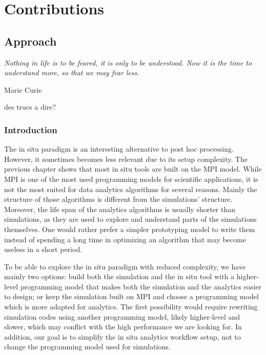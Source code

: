 \pagestyle{fancy}
\fancyhead{}
\fancyfoot{}
\fancyfoot[RO,LE]{\thepage}



\part{Contributions}\label{part:contribution}


\chapter{Approach}\label{chap:approach}
\vspace{20mm}
\epigraph{\textit{Nothing in life is to be feared, it is only to be understood. Now it is the time to understand more, so that we may fear less.}} {Marie Curie}

\vfill
des trucs a dire?

\section{Introduction}

The in situ paradigm is an interesting alternative to post hoc processing. However, it sometimes becomes less relevant due to its setup complexity. 
The previous chapter shows that most in situ tools are built on the MPI model. While MPI is one of the most used programming models for scientific applications, it is not the most suited for data analytics algorithms for several reasons. 
Mainly the structure of those algorithms is different from the simulations' structure. Moreover, the life span of the analytics algorithms is usually shorter than simulations, as they are used to explore and understand parts of the simulations themselves. One would rather prefer a simpler prototyping model to write them instead of spending a long time in optimizing an algorithm that may become useless in a short period.

To be able to explore the in situ paradigm with reduced complexity, we have mainly two options: build both the simulation and the in situ tool with a higher-level programming model that makes both the simulation and the analytics easier to design; or keep the simulation built on MPI and choose a programming model which is more adapted for analytics.
The first possibility would require rewriting simulation codes using another programming model, likely higher-level and slower, which may conflict with the high performance we are looking for. In addition, our goal is to simplify the in situ analytics workflow setup, not to change the programming model used for simulations.

